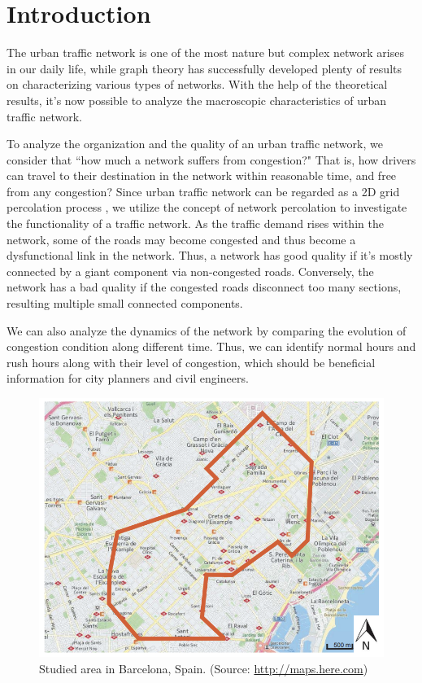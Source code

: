 \section{Introduction}

The urban traffic network is one of the most nature but complex network arises in our daily life, while graph theory has successfully developed plenty of results on characterizing various types of networks. With the help of the theoretical results, it's now possible to analyze the macroscopic characteristics of urban traffic network. 

To analyze the organization and the quality of an urban traffic network, we consider that ``how much a network suffers from congestion?" That is, how drivers can travel to their destination in the network within reasonable time, and free from any congestion? Since urban traffic network can be regarded as a 2D grid percolation process \cite{zeng2019switch}, we utilize the concept of network percolation to investigate the functionality of a traffic network. As the traffic demand rises within the network, some of the roads may become congested and thus become a dysfunctional link in the network. Thus, a network has good quality if it's mostly connected by a giant component via non-congested roads. Conversely, the network has a bad quality if the congested roads disconnect too many sections, resulting multiple small connected components.

We can also analyze the dynamics of the network by comparing the evolution of congestion condition along different time. Thus, we can identify normal hours and rush hours along with their level of congestion, which should be beneficial information for city planners and civil engineers.


\begin{figure}[b]
    \centering
    \includegraphics[width=0.7\linewidth]{images/Map of studied area.png}
    \caption{Studied area in Barcelona, Spain. ({Source: \protect\url{http://maps.here.com}}) }
    \label{fig: barcelona map}
\end{figure}